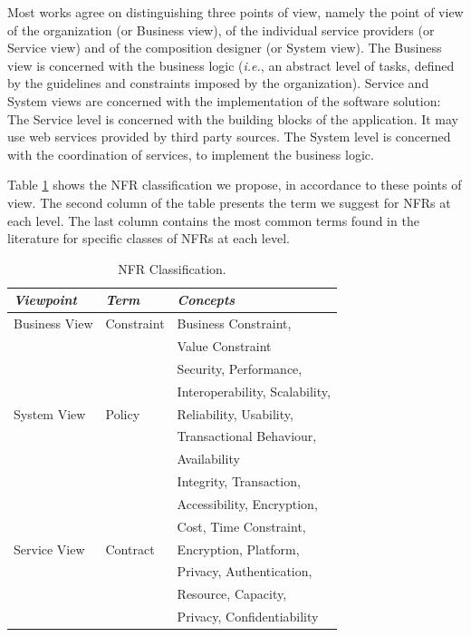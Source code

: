 \documentclass[english,12pt]{article}
\begin{document}
Most works agree on distinguishing three points of view, namely the point of view of the organization (or Business view), of the individual service providers (or Service view) and of the composition designer (or System view).
The Business view is concerned with the business logic (\textit{i.e.}, an abstract level of tasks, defined by the guidelines and constraints imposed by the organization).
Service and System views are concerned with the implementation of the software solution: The Service level is concerned with the building blocks of the application.
It may use web services provided by third party sources.
The System level is concerned with the coordination of services, to implement the business logic.

 


Table \ref{tab:result04} shows the NFR classification we propose, in accordance to these points of view.
The second column of the table presents the term we suggest for NFRs at each level.
The last column contains the most common terms found in the literature for specific classes of NFRs at each level.

\begin{table}[ht!]
\centering
\small
\begin{tabular}{l|l|l}
  \hline 
  \hline
   \textbf{\textit{Viewpoint}} & \textbf{\textit{Term}} & \textbf{\textit{Concepts}}  
   \\
  \hline
  \hline   
  Business View & Constraint  & Business Constraint,    
 \\  
  &   & Value Constraint\\
   \hline    
 
   &  & Security, Performance,\\ 
   & & Interoperability, Scalability,\\
  System View & Policy & Reliability, Usability,\\
   & & Transactional Behaviour,\\
   & & Availability \\ 
   \hline
     &  & Integrity, Transaction,  \\
   &  & Accessibility, Encryption, \\
   &  & Cost, Time Constraint, \\
  Service View & Contract & Encryption, Platform, \\
   &  & Privacy, Authentication, \\
   &  & Resource, Capacity, \\
   &  & Privacy, Confidentiability 
   \\   \hline
  \hline  
\end{tabular}
\caption{NFR Classification.}
\label{tab:result04}
\end{table} 
\end{document}
